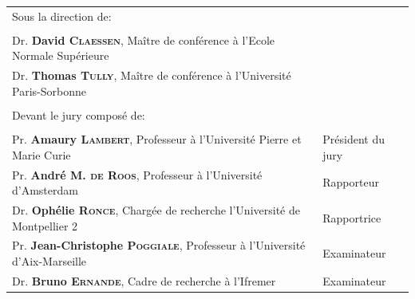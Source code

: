 \begin{titlingpage}
\begin{Spacing}{1}
\begin{flushleft}
\begin{tabularx}{1.03\textwidth}{Xl}
Sous la direction de: &\\
&\\
Dr. \textbf{David \textsc{Claessen}}, Maître de conférence à l'Ecole Normale
Supérieure & \\
Dr. \textbf{Thomas \textsc{Tully}}, Maître de conférence à l'Université
Paris-Sorbonne & \\
&\\
Devant le jury composé de: & \\
& \\
Pr. \textbf{Amaury \textsc{Lambert}}, Professeur à l'Université Pierre
et Marie Curie & Président du jury \\
Pr. \textbf{André M. \textsc{de Roos}}, Professeur à l'Université d'Amsterdam &
Rapporteur \\
Dr. \textbf{Ophélie \textsc{Ronce}}, Chargée de recherche l'Université de
Montpellier 2 & Rapportrice \\
Pr. \textbf{Jean-Christophe \textsc{Poggiale}}, Professeur à l'Université
d'Aix-Marseille & Examinateur\\
Dr. \textbf{Bruno \textsc{Ernande}}, Cadre de recherche à l'Ifremer &
Examinateur
\\
\end{tabularx}

\endgroup
\end{flushleft}
\end{Spacing}
 

\end{titlingpage}